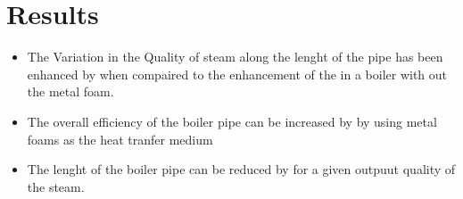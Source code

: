 \documentclass[compileTAMUreport.tex]{subfiles}
\begin{document}
\section{Results}
\begin{itemize}
\item The Variation in the Quality of steam along the lenght of the pipe has been enhanced by  when compaired to the enhancement of the in a boiler with out the metal foam.
\item The overall efficiency of the boiler pipe can be increased by  by using metal foams as the heat tranfer medium 
\item The lenght of the boiler pipe can be reduced by for a given outpuut quality of the steam.

\end{itemize}
\end{document}
